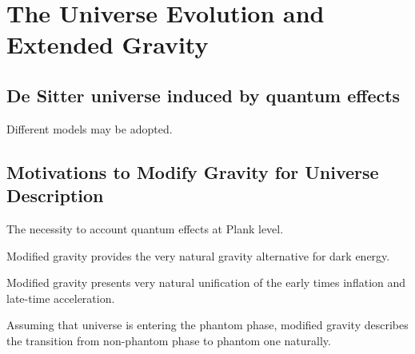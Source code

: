 \documentclass{ctexart}
\begin{document}


\section{The Universe Evolution and Extended Gravity} %
\label{sec:the_universe_evolution_and_extended_gravity}

\subsection{De Sitter universe induced by quantum effects} %
\label{sub:de_sitter_universe_induced_by_quantum_effects}

Different models may be adopted.


\subsection{Motivations to Modify Gravity for Universe Description} %
\label{sub:motivations_to_modify_gravity_for_universe_description}

\begin{cenum}
    \item The necessity to account quantum effects at Plank level.
    \item Modified gravity provides the very natural gravity alternative for dark energy.
    \item Modified gravity presents very natural unification of the early times inflation and late-time acceleration.
    \item Assuming that universe is entering the phantom phase, modified gravity describes the transition from non-phantom phase to phantom one naturally.
\end{cenum}


\end{document}
